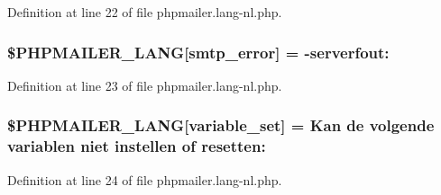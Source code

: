Definition at line 22 of file phpmailer.\+lang-\/nl.\+php.

\subsubsection[{\texorpdfstring{\$\+P\+H\+P\+M\+A\+I\+L\+E\+R\+\_\+\+L\+A\+NG}{$PHPMAILER_LANG}}]{\setlength{\rightskip}{0pt plus 5cm}\$P\+H\+P\+M\+A\+I\+L\+E\+R\+\_\+\+L\+A\+NG\mbox{[}\textquotesingle{}smtp\+\_\+error\textquotesingle{}\mbox{]} = -\/serverfout\+: \textquotesingle{}}\hypertarget{phpmailer_8lang-nl_8php_a7d9cffba1e669c845f8a4c891ee50064}{}\label{phpmailer_8lang-nl_8php_a7d9cffba1e669c845f8a4c891ee50064}


Definition at line 23 of file phpmailer.\+lang-\/nl.\+php.

\subsubsection[{\texorpdfstring{\$\+P\+H\+P\+M\+A\+I\+L\+E\+R\+\_\+\+L\+A\+NG}{$PHPMAILER_LANG}}]{\setlength{\rightskip}{0pt plus 5cm}\$P\+H\+P\+M\+A\+I\+L\+E\+R\+\_\+\+L\+A\+NG\mbox{[}\textquotesingle{}variable\+\_\+set\textquotesingle{}\mbox{]} = \textquotesingle{}Kan de volgende variablen niet instellen of resetten\+: \textquotesingle{}}\hypertarget{phpmailer_8lang-nl_8php_af795debc7a739d038742691c358d9032}{}\label{phpmailer_8lang-nl_8php_af795debc7a739d038742691c358d9032}


Definition at line 24 of file phpmailer.\+lang-\/nl.\+php.

